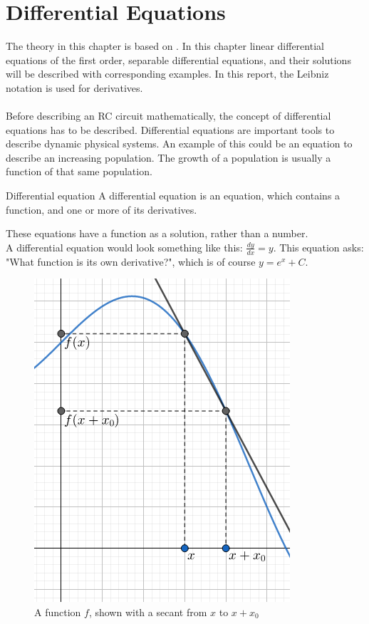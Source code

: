 \chapter{Differential Equations} 
The theory in this chapter is based on \cite{diffandcomplex}. In this chapter linear differential equations of the first order, separable differential equations, and their solutions will be described with corresponding examples. In this report, the Leibniz notation is used for derivatives. 
\\
\\
Before describing an RC circuit mathematically, the concept of differential equations has to be described. Differential equations are important tools to describe dynamic physical systems. An example of this could be an equation to describe an increasing population. The growth of a population is usually a function of that same population.
\begin{definition}{Differential equation}{}
A differential equation is an equation, which contains a function, and one or more of its derivatives.
\end{definition}
\noindent%
These equations have a function as a solution, rather than a number. 
\\
A differential equation would look something like this: $\frac{dy}{dx} = y$. This equation asks: "What function is its own derivative?", which is of course $y=e^x+C$.
\\
\setlength\intextsep{0pt}
\begin{figure}[H]
	\includegraphics[scale=0.5]{fig/img/dydx.png}
	\caption{A function $f$, shown with a secant from $x$ to $x+x_0$}\label{wrap-fig:1}
\end{figure}
